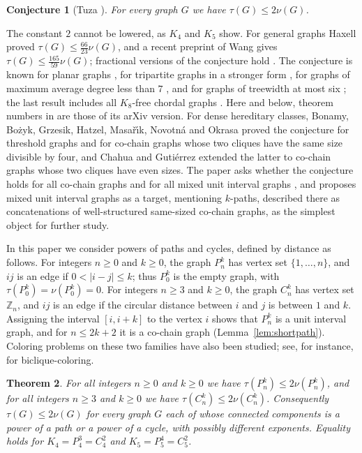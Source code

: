 \documentclass{amsart}
\newtheorem{theorem}{Theorem}[section]
\newtheorem{conjecture}[theorem]{Conjecture}
\theoremstyle{definition}
\theoremstyle{remark}
\numberwithin{equation}{section}
\numberwithin{table}{section}
\newcommand{\Z}{\mathbb{Z}}
\begin{document}
\begin{conjecture}[Tuza \cite{Tuza81,Tuza90}]\label{conj:tuza}
For every graph $G$ we have $\tau(G)\le 2\nu(G)$.
\end{conjecture}

The constant $2$ cannot be lowered, as $K_4$ and $K_5$ show. For general graphs Haxell \cite{Haxell} proved $\tau(G)\le\frac{66}{23}\nu(G)$, and a recent preprint of Wang \cite[Theorem~1]{Wang} gives $\tau(G)\le\frac{165}{59}\nu(G)$; fractional versions of the conjecture hold \cite{Krivelevich}. The conjecture is known for planar graphs \cite{Tuza90}, for tripartite graphs in a stronger form \cite{HaxellKohayakawa}, for graphs of maximum average degree less than $7$ \cite{Puleo}, and for graphs of treewidth at most six \cite[Theorem~3.4]{BFG}; the last result includes all $K_8$-free chordal graphs \cite[Corollary~3.6]{BFG}. Here and below, theorem numbers in \cite{BFG} are those of its arXiv version. For dense hereditary classes, Bonamy, Bo\.zyk, Grzesik, Hatzel, Masa\v{r}\'{\i}k, Novotn\'a and Okrasa \cite{BBGHMNO} proved the conjecture for threshold graphs and for co-chain graphs whose two cliques have the same size divisible by four, and Chahua and Guti\'errez \cite{CG} extended the latter to co-chain graphs whose two cliques have even sizes. The paper \cite{CG} asks whether the conjecture holds for all co-chain graphs and for all mixed unit interval graphs \cite[Section~4, Questions~1 and~2]{CG}, and \cite[Section~1]{BBGHMNO} proposes mixed unit interval graphs as a target, mentioning $k$-paths, described there as concatenations of well-structured same-sized co-chain graphs, as the simplest object for further study.

In this paper we consider powers of paths and cycles, defined by distance as follows. For integers $n\ge0$ and $k\ge0$, the graph $P_n^k$ has vertex set $\{1,\dots,n\}$, and $ij$ is an edge if $0<|i-j|\le k$; thus $P_0^k$ is the empty graph, with $\tau(P_0^k)=\nu(P_0^k)=0$. For integers $n\ge3$ and $k\ge0$, the graph $C_n^k$ has vertex set $\Z_n$, and $ij$ is an edge if the circular distance between $i$ and $j$ is between $1$ and $k$. Assigning the interval $[i,i+k]$ to the vertex $i$ shows that $P_n^k$ is a unit interval graph, and for $n\le2k+2$ it is a co-chain graph (Lemma~\ref{lem:shortpath}). Coloring problems on these two families have also been studied; see, for instance, \cite{MDMF} for biclique-coloring.

\begin{theorem}\label{thm:main}
For all integers $n\ge0$ and $k\ge0$ we have $\tau(P_n^k)\le2\nu(P_n^k)$, and for all integers $n\ge3$ and $k\ge0$ we have $\tau(C_n^k)\le2\nu(C_n^k)$. Consequently $\tau(G)\le2\nu(G)$ for every graph $G$ each of whose connected components is a power of a path or a power of a cycle, with possibly different exponents. Equality holds for $K_4=P_4^3=C_4^2$ and $K_5=P_5^4=C_5^2$.
\end{theorem}
\end{document}
